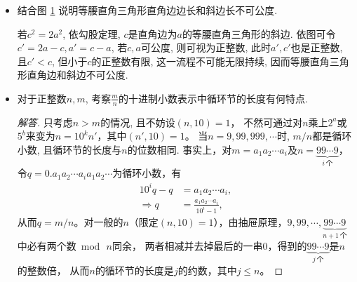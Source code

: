 \begin{2a}
\begin{itemize}
\item[2.] 结合图 \ref{c1t2} 说明等腰直角三角形直角边边长和斜边长不可公度.
        \begin{figure}
            \caption{}
            \label{c1t2}
        \end{figure}

若\(c^2=2a^2\), 依勾股定理, \(c\)是直角边为\(a\)的等腰直角三角形的斜边. 
依图可令\(c'=2a-c,a'=c-a\), 若\(c,a\)可公度, 则可视为正整数, 此时\(a',c'\)也是正整数, 且\(c'<c\), 但小于\(c\)的正整数有限, 这一流程不可能无限持续, 因而等腰直角三角形直角边和斜边不可公度.
\end{itemize}
\end{2a}
\begin{2b}
\begin{itemize}
\item[1.] 对于正整数\(n,m\), 考察\(\frac{m}{n}\)的十进制小数表示中循环节的长度有何特点.
\begin{proof}[解答]
只考虑\(n>m\)的情况, 且不妨设$(n,10)=1$，
不然可通过对$n$乘上$2^a$或$5^b$来变为$n=10^kn'$，其中$(n',10)=1$。
当\(n=9,99,999,\cdots\)时, $m/n$都是循环小数, 且循环节的长度与\(n\)的位数相同.
事实上，对$m=a_1a_2\cdots a_i$及$n=\underbrace{99\cdots9}_{i\,个}$，
令\(q=0.a_1a_2\cdots a_ia_1a_2\cdots\)为循环小数，有
\begin{align*}
    10^iq-q&=a_1a_2\cdots a_i,\\
    \Rightarrow q&=\frac{a_1a_2\cdots a_i}{10^i-1},
\end{align*}
从而$q=m/n$。对一般的$n$（限定$(n,10)=1$），由抽屉原理，$9,99,\cdots,\underbrace{99\cdots9}_{n+1\,个}$中必有两个数$\bmod\,n$同余，
两者相减并去掉最后的一串$0$，得到的$\underbrace{99\cdots9}_{j\,个}$是$n$的整数倍，
从而$n$的循环节的长度是$j$的约数，其中$j \leqslant n$。
\end{proof}
\end{itemize}
\end{2b}
